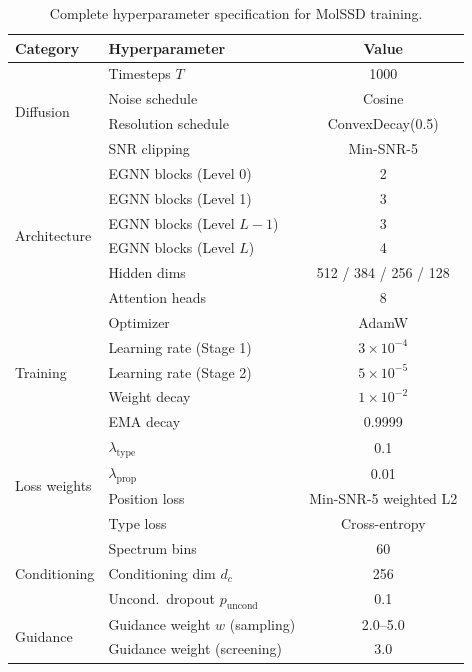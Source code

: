 \documentclass[12pt,a4paper]{article}
\begin{document}
\begin{table}[H]
\centering
\caption{Complete hyperparameter specification for MolSSD training.}
\label{tab:hyperparams}
\begin{tabular}{llc}
\toprule
\textbf{Category} & \textbf{Hyperparameter} & \textbf{Value} \\
\midrule
\multirow{4}{*}{Diffusion} & Timesteps $T$ & 1000 \\
 & Noise schedule & Cosine \\
 & Resolution schedule & ConvexDecay(0.5) \\
 & SNR clipping & Min-SNR-5 \\
\midrule
\multirow{6}{*}{Architecture} & EGNN blocks (Level 0) & 2 \\
 & EGNN blocks (Level 1) & 3 \\
 & EGNN blocks (Level $L-1$) & 3 \\
 & EGNN blocks (Level $L$) & 4 \\
 & Hidden dims & 512 / 384 / 256 / 128 \\
 & Attention heads & 8 \\
\midrule
\multirow{5}{*}{Training} & Optimizer & AdamW \\
 & Learning rate (Stage 1) & $3 \times 10^{-4}$ \\
 & Learning rate (Stage 2) & $5 \times 10^{-5}$ \\
 & Weight decay & $1 \times 10^{-2}$ \\
 & EMA decay & 0.9999 \\
\midrule
\multirow{4}{*}{Loss weights} & $\lambda_{\text{type}}$ & 0.1 \\
 & $\lambda_{\text{prop}}$ & 0.01 \\
 & Position loss & Min-SNR-5 weighted L2 \\
 & Type loss & Cross-entropy \\
\midrule
\multirow{3}{*}{Conditioning} & Spectrum bins & 60 \\
 & Conditioning dim $d_c$ & 256 \\
 & Uncond.\ dropout $p_{\text{uncond}}$ & 0.1 \\
\midrule
\multirow{2}{*}{Guidance} & Guidance weight $w$ (sampling) & 2.0--5.0 \\
 & Guidance weight (screening) & 3.0 \\
\bottomrule
\end{tabular}
\end{table}

\end{document}

